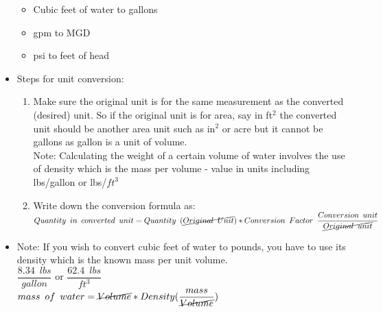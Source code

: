 \begin{itemize}
\begin{itemize}
  \item Cubic feet of water to gallons


  \item gpm to MGD 

  \item psi to feet of head

\end{itemize}

\item Steps for unit conversion:\\
\begin{enumerate}[Step 1:]
\item Make sure the original unit is for the same measurement as the converted (desired) unit.  So if the original unit is for area, say in ft$^2$ the converted unit should be another area unit such as in$^2$ or acre but it cannot be gallons as gallon is a unit of volume.\\
Note:  Calculating the weight of a certain volume of water involves the use of density which is the mass per volume -  value in units including lbs/gallon or lbs/$ft^3$\\

\item Write down the conversion formula as:\\

$Quantity \enspace in \enspace converted \enspace unit = Quantity \enspace (\cancel{Original \enspace Unit}) *   Conversion  \enspace Factor \enspace  \dfrac{Conversion \enspace unit}{\cancel{Original \enspace unit}}$\\
\end{enumerate}

\item Note:  If you wish to convert cubic feet of water to pounds, you have to use its density which is the known mass per unit volume.\\
$\dfrac{8.34 \enspace lbs}{gallon}$ or $\dfrac{62.4 \enspace lbs}{ft^3}$\\
$mass \enspace of \enspace water = \cancel{Volume} *   Density  (\dfrac{mass}{\cancel{Volume}})$\\

\end{itemize}

